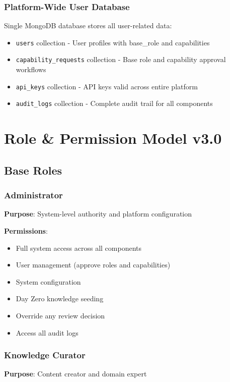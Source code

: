 \documentclass[12pt,a4paper]{article}
\begin{document}
\subsubsection{Platform-Wide User Database}
Single MongoDB database stores all user-related data:
\begin{itemize}
    \item \texttt{users} collection - User profiles with base\_role and capabilities
    \item \texttt{capability\_requests} collection - Base role and capability approval workflows
    \item \texttt{api\_keys} collection - API keys valid across entire platform
    \item \texttt{audit\_logs} collection - Complete audit trail for all components
\end{itemize}

\section{Role \& Permission Model v3.0}

\subsection{Base Roles}

\subsubsection{Administrator}
\textbf{Purpose}: System-level authority and platform configuration

\textbf{Permissions}:
\begin{itemize}
    \item Full system access across all components
    \item User management (approve roles and capabilities)
    \item System configuration
    \item Day Zero knowledge seeding
    \item Override any review decision
    \item Access all audit logs
\end{itemize}

\subsubsection{Knowledge Curator}
\textbf{Purpose}: Content creator and domain expert
\end{document}
